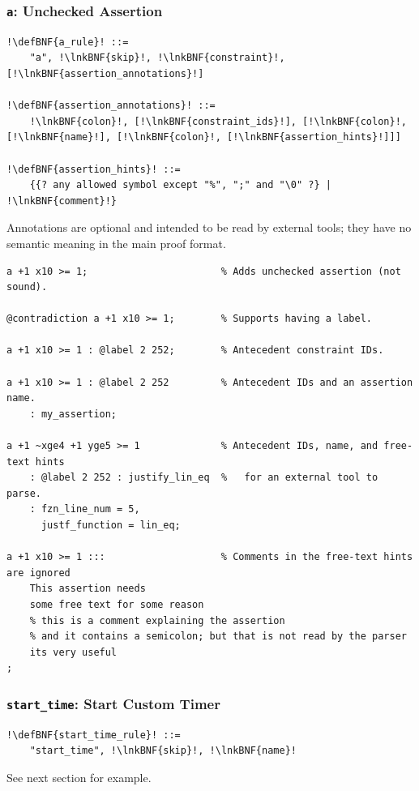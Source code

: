 \documentclass[a4paper]{article}
\newcommand{\defBNF}[1]{\hypertarget{def:#1}{<\detokenize{#1}>}}
\newcommand{\lnkBNF}[1]{\hyperlink{def:#1}{<\detokenize{#1}>}}
\begin{document}
\subsubsection{\texttt{a}: Unchecked Assertion}\label{sec:rules-a}
\begin{lstlisting}
!\defBNF{a_rule}! ::=
	"a", !\lnkBNF{skip}!, !\lnkBNF{constraint}!, [!\lnkBNF{assertion_annotations}!]

!\defBNF{assertion_annotations}! ::=
	!\lnkBNF{colon}!, [!\lnkBNF{constraint_ids}!], [!\lnkBNF{colon}!, [!\lnkBNF{name}!], [!\lnkBNF{colon}!, [!\lnkBNF{assertion_hints}!]]]

!\defBNF{assertion_hints}! ::=
	{{? any allowed symbol except "%", ";" and "\0" ?} | !\lnkBNF{comment}!}
\end{lstlisting}
Annotations are optional and intended to be read by external tools; they have no semantic meaning in the main proof format.
\begin{lstlisting}[language=veripb]
a +1 x10 >= 1;                       % Adds unchecked assertion (not sound).

@contradiction a +1 x10 >= 1;        % Supports having a label.

a +1 x10 >= 1 : @label 2 252;        % Antecedent constraint IDs.

a +1 x10 >= 1 : @label 2 252         % Antecedent IDs and an assertion name.
	: my_assertion;

a +1 ~xge4 +1 yge5 >= 1              % Antecedent IDs, name, and free-text hints
	: @label 2 252 : justify_lin_eq  %   for an external tool to parse.
	: fzn_line_num = 5,
	  justf_function = lin_eq;

a +1 x10 >= 1 :::                    % Comments in the free-text hints are ignored
	This assertion needs
	some free text for some reason
	% this is a comment explaining the assertion
	% and it contains a semicolon; but that is not read by the parser
	its very useful
;
\end{lstlisting}


\subsubsection{\texttt{start\_time}: Start Custom Timer}\label{sec:rules-start-time}
\begin{lstlisting}
!\defBNF{start_time_rule}! ::=
	"start_time", !\lnkBNF{skip}!, !\lnkBNF{name}!
\end{lstlisting}
See next section for example.
\end{document}
